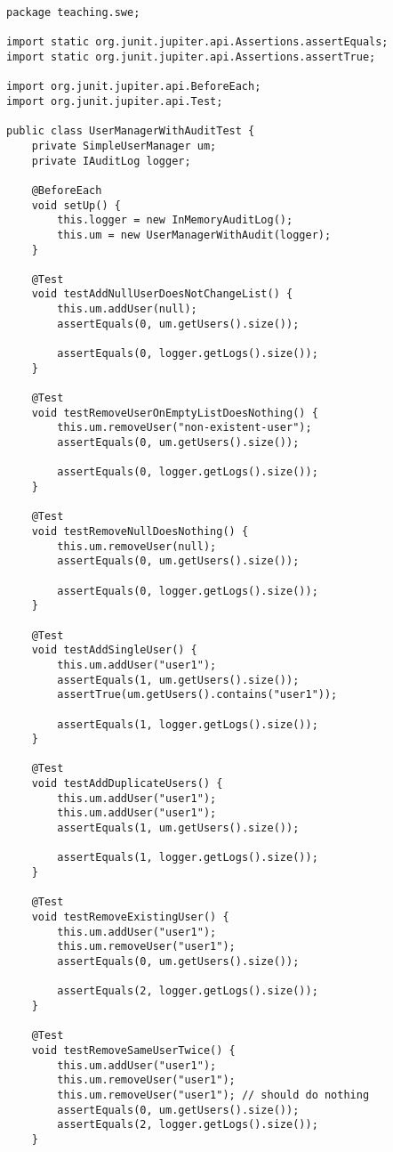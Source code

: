 \begin{lstlisting}[style=javastyle, caption={UserManagerWithAuditTest}]
package teaching.swe;

import static org.junit.jupiter.api.Assertions.assertEquals;
import static org.junit.jupiter.api.Assertions.assertTrue;

import org.junit.jupiter.api.BeforeEach;
import org.junit.jupiter.api.Test;

public class UserManagerWithAuditTest {
    private SimpleUserManager um;
    private IAuditLog logger;

    @BeforeEach
    void setUp() {
        this.logger = new InMemoryAuditLog();
        this.um = new UserManagerWithAudit(logger);
    }

    @Test
    void testAddNullUserDoesNotChangeList() {
        this.um.addUser(null);
        assertEquals(0, um.getUsers().size());

        assertEquals(0, logger.getLogs().size());
    }

    @Test
    void testRemoveUserOnEmptyListDoesNothing() {
        this.um.removeUser("non-existent-user");
        assertEquals(0, um.getUsers().size());

        assertEquals(0, logger.getLogs().size());
    }

    @Test
    void testRemoveNullDoesNothing() {
        this.um.removeUser(null);
        assertEquals(0, um.getUsers().size());

        assertEquals(0, logger.getLogs().size());
    }

    @Test
    void testAddSingleUser() {
        this.um.addUser("user1");
        assertEquals(1, um.getUsers().size());
        assertTrue(um.getUsers().contains("user1"));

        assertEquals(1, logger.getLogs().size());
    }

    @Test
    void testAddDuplicateUsers() {
        this.um.addUser("user1");
        this.um.addUser("user1");
        assertEquals(1, um.getUsers().size());

        assertEquals(1, logger.getLogs().size());
    }

    @Test
    void testRemoveExistingUser() {
        this.um.addUser("user1");
        this.um.removeUser("user1");
        assertEquals(0, um.getUsers().size());

        assertEquals(2, logger.getLogs().size());
    }

    @Test
    void testRemoveSameUserTwice() {
        this.um.addUser("user1");
        this.um.removeUser("user1");
        this.um.removeUser("user1"); // should do nothing
        assertEquals(0, um.getUsers().size());
        assertEquals(2, logger.getLogs().size());
    }


\end{lstlisting}
